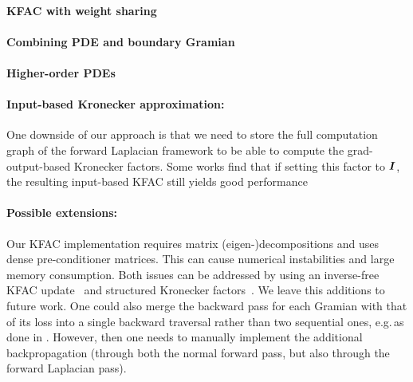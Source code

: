 \paragraph{KFAC with weight sharing}

\paragraph{Combining PDE and boundary Gramian}

\paragraph{Higher-order PDEs}

\paragraph{Input-based Kronecker approximation:} One downside of our approach is that we need to store the full computation graph of the forward Laplacian framework to be able to compute the grad-output-based Kronecker factors.
Some works find that if setting this factor to ${\bm{I}}$, the resulting input-based KFAC still yields good performance~\cite{benzing2022gradient,petersen2023isaac}

\paragraph{Possible extensions:} Our KFAC implementation requires matrix (eigen-)decompositions and uses dense pre-conditioner matrices.
This can cause numerical instabilities and large memory consumption.
Both issues can be addressed by using an inverse-free KFAC update~\cite{lin2023simplifying} and structured Kronecker factors~\cite{lin2023structured}.
We leave this additions to future work.
One could also merge the backward pass for each Gramian with that of its loss into a single backward traversal rather than two sequential ones, e.g.\,as done in \cite{dangel2020backpack}.
However, then one needs to manually implement the additional backpropagation (through both the normal forward pass, but also through the forward Laplacian pass).

